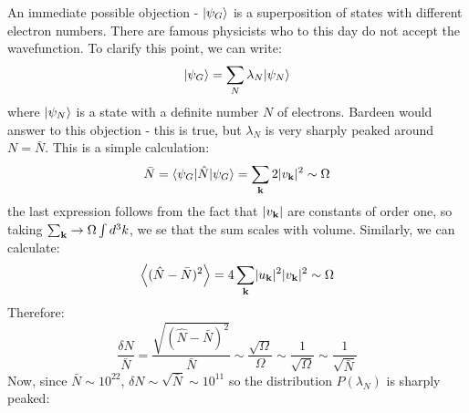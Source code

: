 An immediate possible objection - $\lvert \psi_G \rangle$ is a superposition of states with different electron numbers. There are famous physicists who to this day do not accept the wavefunction. To clarify this point, we can write:
\begin{equation}
    \lvert \psi_G \rangle = \sum_N \lambda_N \lvert \psi_N \rangle
\end{equation}
where $\lvert \psi_N \rangle$ is a state with a definite number $N$ of electrons. Bardeen would answer to this objection - this is true, but $\lambda_N$ is very sharply peaked around $N = \bar{N}$. This is a simple calculation:
\begin{equation}
    \bar{N} = \langle \psi_G \rvert\hat{N}\lvert \psi_G \rangle = \sum_{\mathbf{k}} 2\lvert v_{\mathbf{k}} \rvert^2 \sim \Omega
\end{equation}
the last expression follows from the fact that $\lvert v_{\mathbf{k}} \rvert$ are constants of order one, so taking $\sum_{\mathbf{k}} \to \Omega \int d^3k$, we se that the sum scales with volume. Similarly, we can calculate:
\begin{equation}
    \left< (\hat{N} - \bar{N})^2 \right> = 4\sum_{\mathbf{k}}\lvert u_{\mathbf{k}} \rvert^2\lvert v_{\mathbf{k}} \rvert^2 \sim \Omega
\end{equation}
Therefore:
\begin{equation}
    \frac{\delta N}{\bar{N}} = \frac{\sqrt{(\hat{N} - \bar{N})^2}}{\bar{N}} \sim \frac{\sqrt{\Omega}}{\Omega} \sim \frac{1}{\sqrt{\Omega}} \sim \frac{1}{\sqrt{\bar{N}}}
\end{equation}
Now, since $\bar{N} \sim 10^{22}$, $\delta N \sim \sqrt{\bar{N}} \sim 10^{11}$ so the distribution $P(\lambda_N)$ is sharply peaked:

